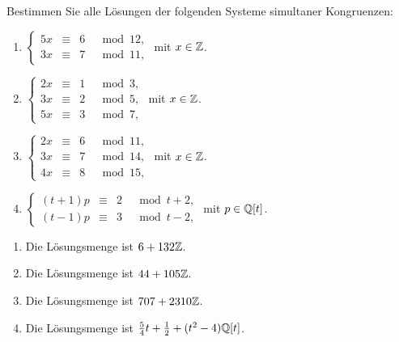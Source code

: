 \begin{question}[subtitle = Simultane Kongruenzen]
  Bestimmen Sie alle Lösungen der folgenden Systeme simultaner Kongruenzen:
  \begin{enumerate}
    \item
      $
        \left\{
          \begin{array}{rcrr}
            5x  &\equiv&  6 & \mod 12, \\
            3x  &\equiv&  7 & \mod 11,
          \end{array}
        \right.
      $
      mit $x \in \mathbb{Z}$.
    \item
      $
        \left\{
          \begin{array}{rcrr}
            2x  &\equiv&  1 & \mod 3, \\
            3x  &\equiv&  2 & \mod 5, \\
            5x  &\equiv&  3 & \mod 7,
          \end{array}
        \right.
      $
      mit $x \in \mathbb{Z}$.
    \item
      $
        \left\{
          \begin{array}{rcrr}
            2x  &\equiv&  6 & \mod 11, \\
            3x  &\equiv&  7 & \mod 14, \\
            4x  &\equiv&  8 & \mod 15,
          \end{array}
        \right.
      $
      mit $x \in \mathbb{Z}$.
    \item
      $
        \left\{
          \begin{array}{rcrr}
            (t+1)p  &\equiv&  2 & \mod t+2, \\
            (t-1)p  &\equiv&  3 & \mod t-2,
          \end{array}
        \right.
      $
      mit $p \in \mathbb{Q}[t]$.
  \end{enumerate}
\end{question}


\begin{solution}
  \begin{enumerate}
    \item
      Die Lösungsmenge ist $6 + 132 \mathbb{Z}$.
    \item
      Die Lösungsmenge ist $44 + 105 \mathbb{Z}$.
    \item
      Die Lösungsmenge ist $707 + 2310 \mathbb{Z}$.
    \item
      Die Lösungsmenge ist $\frac{5}{4}t + \frac{1}{2} + (t^2 - 4) \mathbb{Q}[t]$.
  \end{enumerate}
\end{solution}


